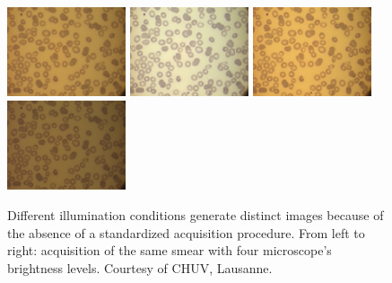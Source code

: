 \documentclass[final,a4paper,12pt,english]{UnicaPhdThesis3}
\begin{document}
\begin{figure}[!b]
	\centering    
	\includegraphics[width=3.5cm]{images/malaria/f1a}
	\includegraphics[width=3.5cm]{images/malaria/f1b}
	\includegraphics[width=3.5cm]{images/malaria/f1c}
	\includegraphics[width=3.5cm]{images/malaria/f1d}
	\caption{\label{fig:images_types} Different illumination conditions generate distinct images because of the absence of a standardized acquisition procedure. From left to right: acquisition of the same smear with four microscope's brightness levels. Courtesy of CHUV, Lausanne.}
	
\end{figure}
\end{document}
